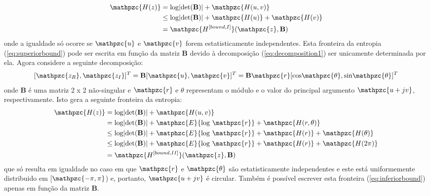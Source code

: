     \begin{equation}\label{eq:superiorbound}
        \begin{split}
            \mathpzc{H(z)} & =\text{log}|\text{det}(\mathbf{B})| + \mathpzc{H(u,v)} \\
                          & \leq \text{log}|\text{det}(\mathbf{B})| + \mathpzc{H(u)} + \mathpzc{H(v)} \\
                          & = \mathpzc{H^{[bound,I]}}(\mathpzc{z},\mathbf{B})
        \end{split}
    \end{equation}
    onde a igualdade só ocorre se $\mathpzc{u}$ e $\mathpzc{v}$ forem estatisticamente independentes. Esta fronteira da entropia (\ref{eq:superiorbound}) pode ser escrita em função da matriz $\mathbf{B}$ devido à decomposição (\ref{eq:decomposition1}) ser unicamente determinada por ela.
    Agora considere a seguinte decomposição:
    \begin{equation}
        \label{eq:decomposition2}
            [\mathpzc{z_R}, \mathpzc{z_I}]^T =
            \mathbf{B}[\mathpzc{u},\mathpzc{v}]^T = \mathbf{B}\mathpzc{r}[\text{cos}\mathpzc{\theta},\text{sin}\mathpzc{\theta}]^T  
    \end{equation}
    onde $\mathbf{B}$ é uma matriz 2 x 2 não-singular e $\mathpzc{r}$ e $\theta$ representam o módulo e o valor do principal argumento $\mathpzc{u + jv}$, respectivamente. Isto gera a seguinte fronteira da entropia:
    \begin{equation}\label{eq:inferiorbound}
        \begin{split}
            \mathpzc{H(z)} & =\text{log}|\text{det}(\mathbf{B})| + \mathpzc{H(u,v)} \\
                          &  = \text{log}|\text{det}(\mathbf{B})| + \matphzc{E}\{\text{log } \mathpzc{r}\} + \mathpzc{H(r,\theta)} \\
                          & \leq \text{log}|\text{det}(\mathbf{B})| + \matphzc{E}\{\text{log } \mathpzc{r}\} + \mathpzc{H(r)} + \mathpzc{H(\theta)} \\
                          & \leq \text{log}|\text{det}(\mathbf{B})| + \matphzc{E}\{\text{log } \mathpzc{r}\} + \mathpzc{H(r)} + \mathpzc{H(2\pi)} \\
                          & = \mathpzc{H^{[bound,II]}}(\mathpzc{z},\mathbf{B})
            \end{split}
    \end{equation}
    que só resulta em igualdade no caso em que $\mathpzc{r}$ e $\mathpzc{\theta}$ são estatisticamente independentes e este está uniformemente distribuido em [$\mathpzc{-\pi,\pi}$) e, portanto, $\mathpzc{u + jv}$ é circular. Também é possível escrever esta fronteira (\ref{eq:inferiorbound}) apenas em função da matriz $\mathbf{B}$. 
    
